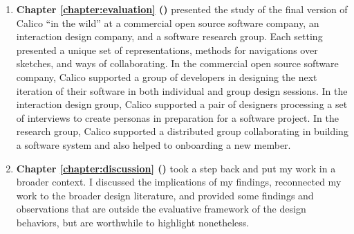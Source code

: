 \begin{enumerate}
   \item \textbf{Chapter \ref{chapter:evaluation} ()} presented the study of the final version of Calico ``in the wild'' at a commercial open source software company, an interaction design company, and a software research group. Each setting presented a unique set of representations, methods for navigations over sketches, and ways of collaborating. In the commercial open source software company, Calico supported a group of developers in designing the next iteration of their software in both individual and group design sessions. In the interaction design group, Calico supported a pair of designers processing a set of interviews to create personas in preparation for a software project. In the research group, Calico supported a distributed group collaborating in building a software system and also helped to onboarding a new member.

   \item \textbf{Chapter \ref{chapter:discussion} ()} took a step back and put my work in a broader context. I discussed the implications of my findings, reconnected my work to the broader design literature, and provided some findings and observations that are outside the evaluative framework of the design behaviors, but are worthwhile to highlight nonetheless. 
   
   
   

\end{enumerate}
